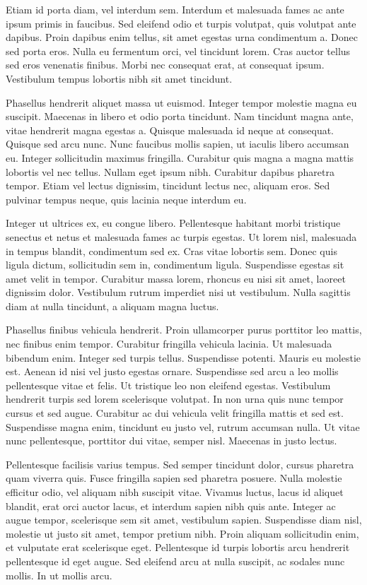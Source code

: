 Etiam id porta diam, vel interdum sem. Interdum et malesuada fames ac ante ipsum primis in faucibus. Sed eleifend odio et turpis volutpat, quis volutpat ante dapibus. Proin dapibus enim tellus, sit amet egestas urna condimentum a. Donec sed porta eros. Nulla eu fermentum orci, vel tincidunt lorem. Cras auctor tellus sed eros venenatis finibus. Morbi nec consequat erat, at consequat ipsum. Vestibulum tempus lobortis nibh sit amet tincidunt.

Phasellus hendrerit aliquet massa ut euismod. Integer tempor molestie magna eu suscipit. Maecenas in libero et odio porta tincidunt. Nam tincidunt magna ante, vitae hendrerit magna egestas a. Quisque malesuada id neque at consequat. Quisque sed arcu nunc. Nunc faucibus mollis sapien, ut iaculis libero accumsan eu. Integer sollicitudin maximus fringilla. Curabitur quis magna a magna mattis lobortis vel nec tellus. Nullam eget ipsum nibh. Curabitur dapibus pharetra tempor. Etiam vel lectus dignissim, tincidunt lectus nec, aliquam eros. Sed pulvinar tempus neque, quis lacinia neque interdum eu.

Integer ut ultrices ex, eu congue libero. Pellentesque habitant morbi tristique senectus et netus et malesuada fames ac turpis egestas. Ut lorem nisl, malesuada in tempus blandit, condimentum sed ex. Cras vitae lobortis sem. Donec quis ligula dictum, sollicitudin sem in, condimentum ligula. Suspendisse egestas sit amet velit in tempor. Curabitur massa lorem, rhoncus eu nisi sit amet, laoreet dignissim dolor. Vestibulum rutrum imperdiet nisi ut vestibulum. Nulla sagittis diam at nulla tincidunt, a aliquam magna luctus.

Phasellus finibus vehicula hendrerit. Proin ullamcorper purus porttitor leo mattis, nec finibus enim tempor. Curabitur fringilla vehicula lacinia. Ut malesuada bibendum enim. Integer sed turpis tellus. Suspendisse potenti. Mauris eu molestie est. Aenean id nisi vel justo egestas ornare. Suspendisse sed arcu a leo mollis pellentesque vitae et felis. Ut tristique leo non eleifend egestas. Vestibulum hendrerit turpis sed lorem scelerisque volutpat. In non urna quis nunc tempor cursus et sed augue. Curabitur ac dui vehicula velit fringilla mattis et sed est. Suspendisse magna enim, tincidunt eu justo vel, rutrum accumsan nulla. Ut vitae nunc pellentesque, porttitor dui vitae, semper nisl. Maecenas in justo lectus.

Pellentesque facilisis varius tempus. Sed semper tincidunt dolor, cursus pharetra quam viverra quis. Fusce fringilla sapien sed pharetra posuere. Nulla molestie efficitur odio, vel aliquam nibh suscipit vitae. Vivamus luctus, lacus id aliquet blandit, erat orci auctor lacus, et interdum sapien nibh quis ante. Integer ac augue tempor, scelerisque sem sit amet, vestibulum sapien. Suspendisse diam nisl, molestie ut justo sit amet, tempor pretium nibh. Proin aliquam sollicitudin enim, et vulputate erat scelerisque eget. Pellentesque id turpis lobortis arcu hendrerit pellentesque id eget augue. Sed eleifend arcu at nulla suscipit, ac sodales nunc mollis. In ut mollis arcu.

